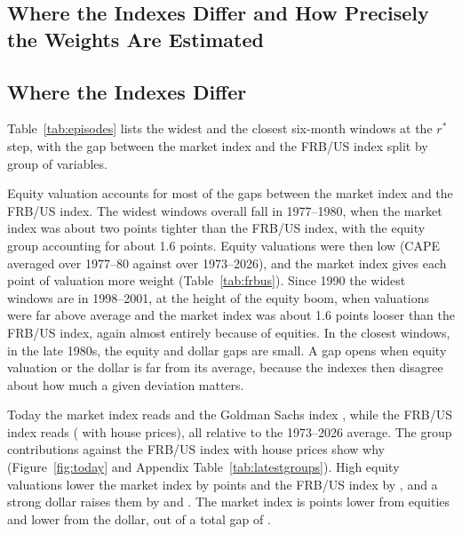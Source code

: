 \documentclass[11pt]{article}
\newcommand{\rs}{r^{*}}
\begin{document}
\begin{appendices}





\section{Where the Indexes Differ and How Precisely the Weights Are Estimated}\label{app:differ}
\subsection{Where the Indexes Differ}\label{sec:where}
Table~\ref{tab:episodes} lists the widest and the closest six-month windows at the $\rs$ step, with the gap between the market index and the FRB/US index split by group of variables.



Equity valuation accounts for most of the gaps between the market index and the FRB/US index. The widest windows overall fall in 1977--1980, when the market index was about two points tighter than the FRB/US index, with the equity group accounting for about 1.6 points. Equity valuations were then low (CAPE averaged  over 1977--80 against  over 1973--2026), and the market index gives each point of valuation more weight (Table~\ref{tab:frbus}). Since 1990 the widest windows are in 1998--2001, at the height of the equity boom, when valuations were far above average and the market index was about 1.6 points looser than the FRB/US index, again almost entirely because of equities. In the closest windows, in the late 1980s, the equity and dollar gaps are small. A gap opens when equity valuation or the dollar is far from its average, because the indexes then disagree about how much a given deviation matters.

Today the market index reads  and the Goldman Sachs index , while the FRB/US index reads  ( with house prices), all relative to the 1973--2026 average. The group contributions against the FRB/US index with house prices show why (Figure~\ref{fig:today} and Appendix Table~\ref{tab:latestgroups}). High equity valuations lower the market index by  points and the FRB/US index by , and a strong dollar raises them by  and . The market index is  points lower from equities and  lower from the dollar, out of a total gap of .


\end{appendices}
\end{document}
